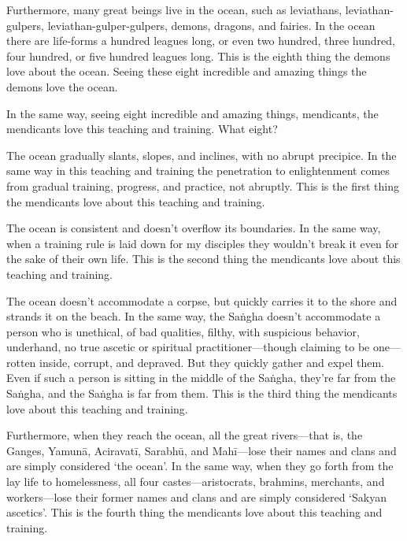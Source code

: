 \documentclass[12pt,openany]{book}%
\begin{document}
Furthermore, many great beings live in the ocean, such as leviathans, leviathan-gulpers, leviathan-gulper-gulpers, demons, dragons, and fairies. In the ocean there are life-forms a hundred leagues long, or even two hundred, three hundred, four hundred, or five hundred leagues long. This is the eighth thing the demons love about the ocean. Seeing these eight incredible and amazing things the demons love the ocean. 

In the same way, seeing eight incredible and amazing things, mendicants, the mendicants love this teaching and training. What eight? 

The ocean gradually slants, slopes, and inclines, with no abrupt precipice. In the same way in this teaching and training the penetration to enlightenment comes from gradual training, progress, and practice, not abruptly. This is the first thing the mendicants love about this teaching and training. 

The ocean is consistent and doesn’t overflow its boundaries. In the same way, when a training rule is laid down for my disciples they wouldn’t break it even for the sake of their own life. This is the second thing the mendicants love about this teaching and training. 

The ocean doesn’t accommodate a corpse, but quickly carries it to the shore and strands it on the beach. In the same way, the \textsanskrit{Saṅgha} doesn’t accommodate a person who is unethical, of bad qualities, filthy, with suspicious behavior, underhand, no true ascetic or spiritual practitioner—though claiming to be one—rotten inside, corrupt, and depraved. But they quickly gather and expel them. Even if such a person is sitting in the middle of the \textsanskrit{Saṅgha}, they’re far from the \textsanskrit{Saṅgha}, and the \textsanskrit{Saṅgha} is far from them. This is the third thing the mendicants love about this teaching and training. 

Furthermore, when they reach the ocean, all the great rivers—that is, the Ganges, \textsanskrit{Yamunā}, \textsanskrit{Aciravatī}, \textsanskrit{Sarabhū}, and \textsanskrit{Mahī}—lose their names and clans and are simply considered ‘the ocean’. In the same way, when they go forth from the lay life to homelessness, all four castes—aristocrats, brahmins, merchants, and workers—lose their former names and clans and are simply considered ‘Sakyan ascetics’. This is the fourth thing the mendicants love about this teaching and training. 
\end{document}
